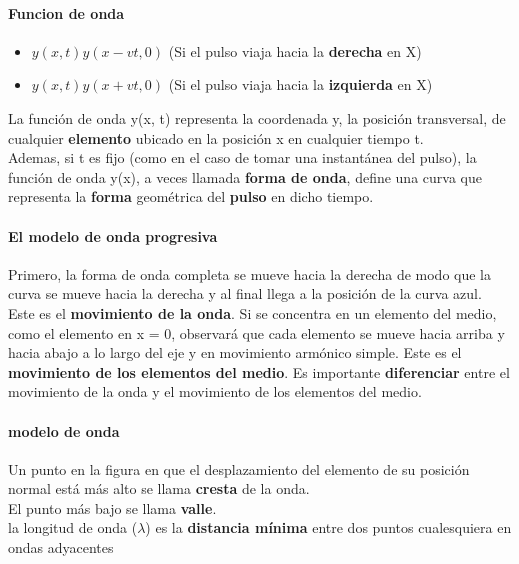 \documentclass[10pt]{article}
\begin{document}
\paragraph{Funcion de onda}
\begin{itemize}
    \item $y(x, t) y(x-vt, 0)$ (Si el pulso viaja hacia la \textbf{derecha} en X)
    \item $y(x, t) y(x+vt, 0)$ (Si el pulso viaja hacia la \textbf{izquierda} en X)
\end{itemize}

La función de onda y(x, t) representa la coordenada y, la posición transversal,
de cualquier \textbf{elemento} ubicado en la posición x en cualquier tiempo t.\\
\linebreak
Ademas, si t es fijo (como en el caso de tomar una instantánea del pulso), la función 
de onda y(x), a veces llamada \textbf{forma de onda}, define una curva que representa la 
\textbf{forma} geométrica del \textbf{pulso} en dicho tiempo.

\paragraph{El modelo de onda progresiva}

Primero, la forma de onda completa se mueve hacia la derecha de modo que la curva 
se mueve hacia la derecha y al final llega a la posición de la curva azul. Este es el \textbf{movimiento 
de la onda}. Si se concentra en un elemento del medio, como el elemento en x = 0, observará que cada
elemento se mueve hacia arriba y hacia abajo a lo largo del eje y en movimiento armónico
simple. Este es el \textbf{movimiento de los elementos del medio}. Es importante \textbf{diferenciar} entre el
movimiento de la onda y el movimiento de los elementos del medio.

\paragraph{modelo de onda}

Un punto en la figura en que el desplazamiento del elemento de su 
posición normal está más alto se llama \textbf{cresta} de la onda.\\

El punto más bajo se llama \textbf{valle}.\\

la longitud de onda ($\lambda$) es la \textbf{distancia mínima} entre dos puntos
cualesquiera en ondas adyacentes\\
\end{document}
